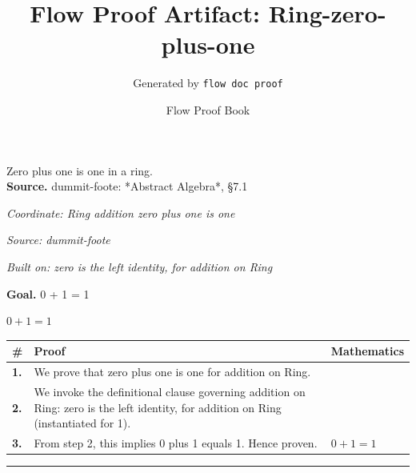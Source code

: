 \documentclass[11pt]{article}
\title{Flow Proof Artifact: Ring-zero-plus-one}
\author{Generated by \texttt{flow doc proof}}
\date{Flow Proof Book}
\theoremstyle{definition}
\begin{document}
\maketitle
Zero plus one is one in a ring.\\[0.5em]
\textbf{Source.} dummit-foote: *Abstract Algebra*, §7.1\\[0.5em]
\bigskip
{}\par
\smallskip\noindent\textit{Coordinate: Ring \cdot addition \cdot zero plus one is one}\par
\smallskip\noindent\textit{Source: dummit-foote}\par
\smallskip\noindent\textit{Built on: zero is the left identity, for addition on Ring}\par
\medskip
\noindent\textbf{Goal.} 0 + 1 = 1\par
\noindent$\displaystyle 0 + 1 = 1$\par
\medskip
\noindent
\begin{tabular}{@{} >{\raggedright\arraybackslash}p{} >{\raggedright\arraybackslash}p{} >{\raggedleft\arraybackslash}p{} @{}}
\textbf{\#} & \textbf{Proof} & \textbf{Mathematics} \\
\midrule
\textbf{1.} & We prove that zero plus one is one for addition on Ring. & \\[0.45em]
\textbf{2.} & We invoke the definitional clause governing addition on Ring: zero is the left identity, for addition on Ring (instantiated for 1). & \\[0.45em]
\textbf{3.} & From step 2, this implies 0 plus 1 equals 1. Hence proven. & $\displaystyle 0 + 1 = 1$ \\[0.45em]
\bottomrule
\end{tabular}
\label{thm:Ring-addition-zero_plus_one_is_one}
\par\medskip\hrule
\end{document}
